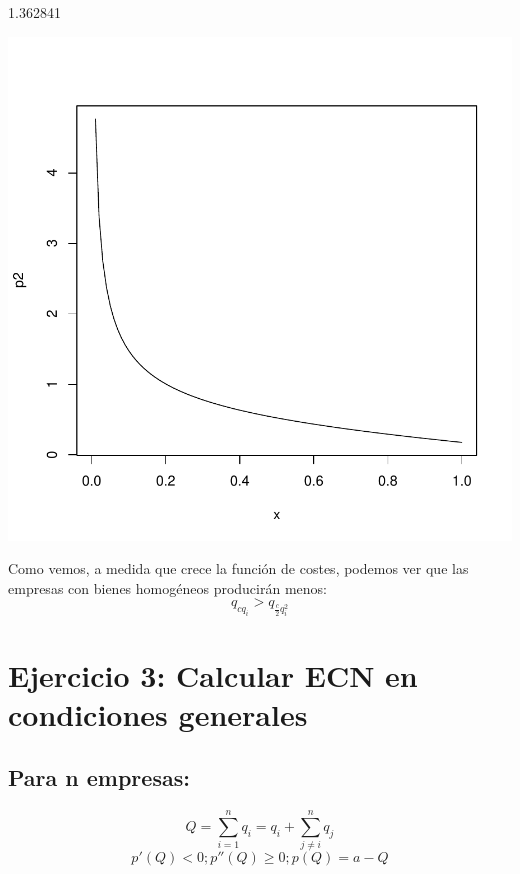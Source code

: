 \documentclass{article}
\begin{document}
\begin{Schunk}
\begin{Soutput}
[1] 1.362841
\end{Soutput}
\end{Schunk}
\includegraphics{PUTAPRUEBA-002}

Como vemos, a medida que crece la funci\'on de costes, podemos ver que las empresas con bienes homog\'eneos producir\'an menos: 
$$q_{cq_i}>q_{\frac{c}{2}q_i^2}$$

\section{Ejercicio 3: Calcular ECN en condiciones generales} 

\subsection{Para n empresas:}

$$Q=\sum_{i=1}^nq_i=q_i+\sum_{j\neq i}^nq_j$$             
$$p'(Q)<0; p''(Q)\geq0; p(Q)=a-Q$$                                
         
\end{document}
